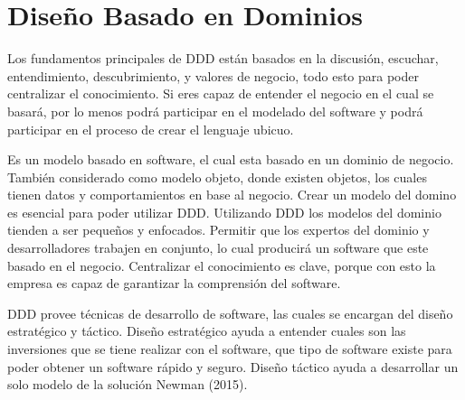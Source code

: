 \documentclass[12pt,twoside]{reedthesis}
\begin{document}
\hypertarget{diseno-basado-en-dominios}{%
\section{Diseño Basado en Dominios}\label{diseno-basado-en-dominios}}

Los fundamentos principales de DDD están basados en la discusión, escuchar, entendimiento, descubrimiento, y valores de negocio, todo esto para poder centralizar el conocimiento. Si eres capaz de entender el negocio en el cual se basará, por lo menos podrá participar en el modelado del software y podrá participar en el proceso de crear el lenguaje ubicuo.

Es un modelo basado en software, el cual esta basado en un dominio de negocio. También considerado como modelo objeto, donde existen objetos, los cuales tienen datos y comportamientos en base al negocio. Crear un modelo del domino es esencial para poder utilizar DDD. Utilizando DDD los modelos del dominio tienden a ser pequeños y enfocados.
Permitir que los expertos del dominio y desarrolladores trabajen en conjunto, lo cual producirá un software que este basado en el negocio.
Centralizar el conocimiento es clave, porque con esto la empresa es capaz de garantizar la comprensión del software.

DDD provee técnicas de desarrollo de software, las cuales se encargan del diseño estratégico y táctico. Diseño estratégico ayuda a entender cuales son las inversiones que se tiene realizar con el software, que tipo de software existe para poder obtener un software rápido y seguro. Diseño táctico ayuda a desarrollar un solo modelo de la solución Newman (2015).
\end{document}
